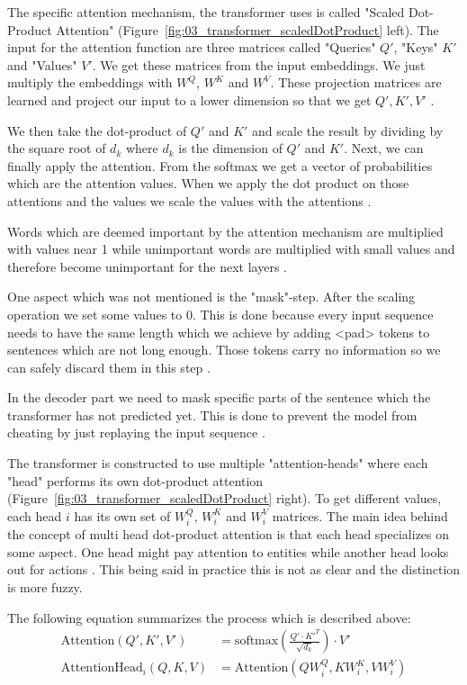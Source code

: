 The specific attention mechanism, the transformer uses is called "Scaled Dot-Product Attention" {(Figure~\ref{fig:03_transformer_scaledDotProduct} left)}. The input for the attention function are three matrices called "Queries" $Q'$, "Keys" $K'$ and "Values" $V'$. We get these matrices from the input embeddings. We just multiply the embeddings with $W^Q$, $W^K$ and $W^V$. These projection matrices are learned and project our input to a lower dimension so that we get $Q', K', V'$ \cite{Vaswani2017d}.
\bigskip

We then take the dot-product of $Q'$ and $K'$ and scale the result by dividing by the square root of $d_k$ where $d_k$ is the dimension of $Q'$ and $K'$. Next, we can finally apply the attention. From the softmax we get a vector of probabilities which are the attention values. When we apply the dot product on those attentions and the values we scale the values with the attentions \cite{Vaswani2017d}. 
\medskip

Words which are deemed important by the attention mechanism are multiplied with values near 1 while unimportant words are multiplied with small values and therefore become unimportant for the next layers \cite{Vaswani2017d}.
\medskip

One aspect which was not mentioned is the "mask"-step. After the scaling operation we set some values to 0. This is done because every input sequence needs to have the same length which we achieve by adding <pad> tokens to sentences which are not long enough. Those tokens carry no information so we can safely discard them in this step \cite{Vaswani2017d}. 

In the decoder part we need to mask specific parts of the sentence which the transformer has not predicted yet. This is done to prevent the model from cheating by just replaying the input sequence \cite{Vaswani2017d}.
\medskip

The transformer is constructed to use multiple "attention-heads" where each "head" performs its own dot-product attention {(Figure~\ref{fig:03_transformer_scaledDotProduct} right)}. To get different values, each head $i$ has its own set of $W_i^Q$, $W_i^K$ and $W_i^V$ matrices. The main idea behind the concept of multi head dot-product attention is that each head specializes on some aspect. One head might pay attention to entities while another head looks out for actions \cite{Vaswani2017d}. This being said in practice this is not as clear and the distinction is more fuzzy.

The following equation summarizes the process which is described above:
\begin{align}
	\text{Attention}(Q', K', V') & = \text{softmax}(\frac{Q' \cdot K'^T}{\sqrt{d_k}}) \cdot V' \\
	\text{AttentionHead}_i(Q, K, V) & = \text{Attention}(QW_i^Q, KW_i^K, VW_i^V)
\end{align}

